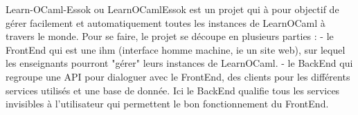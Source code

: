 \documentclass{article}
\begin{document}
Learn-OCaml-Essok ou LearnOCamlEssok est un projet qui à pour objectif de gérer facilement et automatiquement toutes les instances de LearnOCaml à travers le monde.
\newline
Pour se faire, le projet se découpe en plusieurs parties :
\newline
\newline
- le FrontEnd qui est une ihm (interface homme machine, ie un site web), sur lequel les enseignants pourront "gérer" leurs instances de LearnOCaml.
\newline
\newline
- le BackEnd qui regroupe une API pour dialoguer avec le FrontEnd, des clients pour les différents services utilisés et une base de donnée.
\newline
\newline
Ici le BackEnd qualifie tous les services invisibles à l'utilisateur qui permettent le bon fonctionnement du FrontEnd.
\newpage
\end{document}
